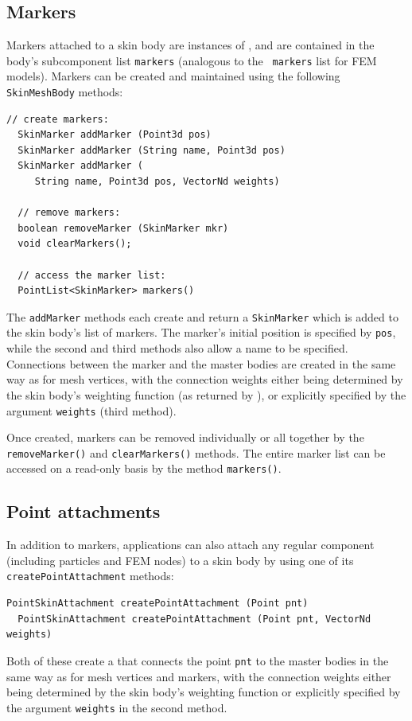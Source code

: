 \subsection{Markers}

Markers attached to a skin body are instances of
, and are contained in
the body's subcomponent list {\tt markers} (analogous to the {\tt
markers} list for FEM models). Markers can be created and maintained
using the following {\tt SkinMeshBody} methods:
%
\begin{lstlisting}[]
  // create markers:
  SkinMarker addMarker (Point3d pos)
  SkinMarker addMarker (String name, Point3d pos)
  SkinMarker addMarker (
     String name, Point3d pos, VectorNd weights)

  // remove markers:
  boolean removeMarker (SkinMarker mkr)
  void clearMarkers();

  // access the marker list:
  PointList<SkinMarker> markers()
\end{lstlisting}
%
The {\tt addMarker} methods each create and return a {\tt SkinMarker}
which is added to the skin body's list of markers. The marker's
initial position is specified by {\tt pos}, while the second and third
methods also allow a name to be specified. Connections between the
marker and the master bodies are created in the same way as for mesh
vertices, with the connection weights either being determined by the
skin body's weighting function (as returned by
),
or explicitly specified by the argument {\tt weights} (third method).

Once created, markers can be removed individually or all together by
the {\tt removeMarker()} and {\tt clearMarkers()} methods. The entire
marker list can be accessed on a read-only basis by the method
{\tt markers()}.

\subsection{Point attachments}

In addition to markers, applications can also attach any regular
 component (including
particles and FEM nodes) to a skin body by using one of its
{\tt createPointAttachment} methods:
%
\begin{lstlisting}[]
  PointSkinAttachment createPointAttachment (Point pnt)
  PointSkinAttachment createPointAttachment (Point pnt, VectorNd weights)
\end{lstlisting}
%
Both of these create a
 that
connects the point {\tt pnt} to the master bodies in the same way as
for mesh vertices and markers, with the connection weights either
being determined by the skin body's weighting function or explicitly
specified by the argument {\tt weights} in the second method.

